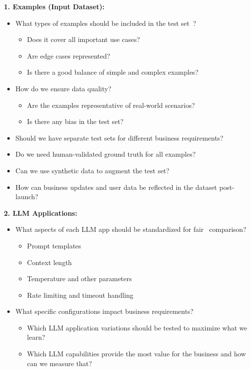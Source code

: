 \textbf{1. Examples (Input Dataset):}
\begin{itemize}
    \item What types of examples should be included in the test set~?
    \begin{itemize}
        \item Does it cover all important use cases?
        \item Are edge cases represented?
        \item Is there a good balance of simple and complex examples?
    \end{itemize}
    \item How do we ensure data quality?
    \begin{itemize}
        \item Are the examples representative of real-world scenarios?
        \item Is there any bias in the test set?
    \end{itemize}
    \item Should we have separate test sets for different business requirements?
    \item Do we need human-validated ground truth for all examples?
    \item Can we use synthetic data to augment the test set?
    \item How can business updates and user data be reflected in the dataset post-launch?
\end{itemize}

\textbf{2. LLM Applications:}
\begin{itemize}
    \item What aspects of each LLM app should be standardized for fair~ comparison?
    \begin{itemize}
        \item Prompt templates
        \item Context length
        \item Temperature and other parameters
        \item Rate limiting and timeout handling
    \end{itemize}
    \item What specific configurations impact business requirements?
    \begin{itemize}
        \item Which LLM application variations should be tested to maximize what we learn?
        \item Which LLM capabilities provide the most value for the business and how can we measure that?
    \end{itemize}
\end{itemize}

